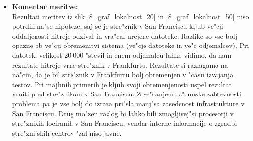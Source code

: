 \begin{itemize}
    \newpage
	\item \textbf{Komentar meritve: } \\ 
		Rezultati meritev iz slik \ref{8_graf_lokalnost_20} in \ref{8_graf_lokalnost_50} niso potrdili na"se hipoteze, saj se je stre"znik v San Franciscu kljub ve"cji oddaljenosti hitreje odzival in vra"cal urejene datoteke. 
		Razlike so vse bolj opazne ob ve"cji obremenitvi sistema (ve"cje datoteke in ve"c odjemalcev). Pri datoteki velikost 20,000 "stevil in enem odjemalcu lahko vidimo, da nam rezultate hitreje vrne stre"znik v Frankfurtu. Rezultate si razlagamo na na"cin, da je bil stre"znik v Frankfurtu bolj obremenjen v "casu izvajanja testov. Pri majhnih primerih je kljub svoji obremenjenosti uspel rezultat vrniti pred stre"znikom v San Franciscu. Z ve"canjem ra"cunske zahtevnosti problema pa je vse bolj do izraza pri"sla manj"sa zasedenost infrastrukture v San Franciscu. Drug mo"zen razlog bi lahko bili zmogljivej"si procesorji v stre"znikih lociranih v San Franciscu, vendar interne informacije o zgradbi stre"zni"skih centrov "zal niso javne.
\end{itemize}

\newpage
